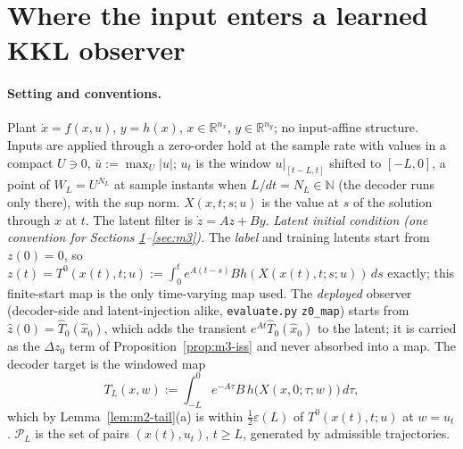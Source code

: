 \section{Where the input enters a learned KKL observer}\label{sec:m1}

\paragraph{Setting and conventions.} Plant $\dot x=f(x,u)$, $y=h(x)$, $x\in\mathbb R^{n_x}$,
$y\in\mathbb R^{n_y}$; no input-affine structure. Inputs are applied through a zero-order hold at the
sample rate with values in a compact $U\ni0$, $\bar u:=\max_{U}|u|$; $u_t$ is the window $u|_{[t-L,t]}$
shifted to $[-L,0]$, a point of $W_L=U^{N_L}$ at sample instants when $L/dt=N_L\in\mathbb N$ (the decoder
runs only there), with the sup norm. $X(x,t;s;u)$ is the value at $s$ of the solution through $x$ at $t$.
The latent filter is $\dot z=Az+By$. \emph{Latent initial condition (one convention for Sections
\ref{sec:m1}--\ref{sec:m3}).} The \emph{label} and training latents start from $z(0)=0$, so
$z(t)=T^0(x(t),t;u):=\int_0^te^{A(t-s)}Bh(X(x(t),t;s;u))\,ds$ exactly; this finite-start map is the only
time-varying map used. The \emph{deployed} observer (decoder-side and latent-injection alike, \texttt{evaluate.py}
\texttt{z0\_map}) starts from $\hat z(0)=\hat T_0(\hat x_0)$, which adds the transient $e^{At}\hat T_0(\hat x_0)$ to
the latent; it is carried as the $\Delta z_0$ term of Proposition~\ref{prop:m3-iss} and never absorbed into a map.
The decoder target is the windowed map
\begin{equation}\label{eq:m1-TL}
T_L(x,w):=\int_{-L}^{0}e^{-A\tau}B\,h\big(X(x,0;\tau;w)\big)\,d\tau,
\end{equation}
which by Lemma~\ref{lem:m2-tail}(a) is within $\tfrac12\varepsilon(L)$ of $T^0(x(t),t;u)$ at $w=u_t$.
$\mathcal P_L$ is the set of pairs $(x(t),u_t)$, $t\ge L$, generated by admissible trajectories.


